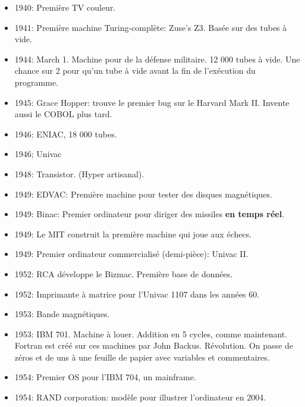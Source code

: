 \documentclass[a4paper,11pt]{article}
\begin{document}
\begin{itemize}
\item 1940: Première TV couleur.

\item 1941: Première machine Turing-complète: Zuse's Z3. Basée sur des tubes à
  vide.

\item 1944: March 1. Machine pour de la défense militaire. 12 000 tubes à vide.
  Une chance sur 2 pour qu'un tube à vide avant la fin de l'exécution du
  programme.

\item 1945: Grace Hopper: trouve le premier bug sur le Harvard Mark II.
  Invente aussi le COBOL plus tard.

\item 1946: ENIAC, 18 000 tubes.

\item 1946; Univac

\item 1948: Transistor. (Hyper artisanal).

\item 1949: EDVAC: Première machine pour tester des disques magnétiques.

\item 1949: Binac: Premier ordinateur pour diriger des missiles \textbf{en temps
    réel}.

\item 1949: Le MIT construit la première machine qui joue aux échecs.

\item 1949: Premier ordinateur commercialisé (demi-pièce): Univac II.

\item 1952: RCA développe le Bizmac. Première base de données.

\item 1952: Imprimante à matrice pour l'Univac 1107 dans les années 60.

\item 1953:  Bande magnétiques.

\item 1953: IBM 701. Machine à louer. Addition en 5 cycles, comme maintenant.
  Fortran est créé sur ces machines par John Backus. Révolution. On passe de
  zéros et de uns à une feuille de papier avec variables et commentaires.

\item 1954: Premier OS pour l'IBM 704, un mainframe.

\item 1954: RAND corporation: modèle pour illustrer l'ordinateur en 2004.


\end{itemize}
\end{document}
